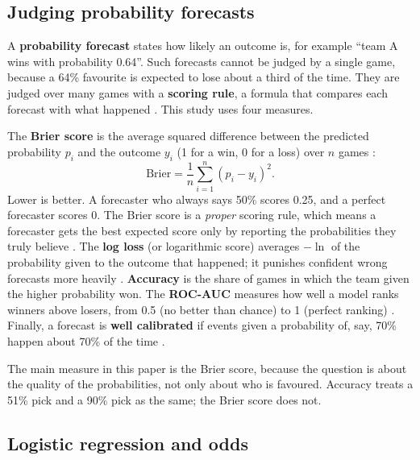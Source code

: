 \documentclass[12pt,a4paper]{article}
\begin{document}
\subsection{Judging probability forecasts}

A \textbf{probability forecast} states how likely an outcome is, for example ``team A wins with probability 0.64''. Such forecasts cannot be judged by a single game, because a 64\% favourite is expected to lose about a third of the time. They are judged over many games with a \textbf{scoring rule}, a formula that compares each forecast with what happened \citep{gneiting2007}. This study uses four measures.

The \textbf{Brier score} is the average squared difference between the predicted probability $p_i$ and the outcome $y_i$ (1 for a win, 0 for a loss) over $n$ games \citep{brier1950}:
\begin{equation}
\text{Brier} = \frac{1}{n}\sum_{i=1}^{n} (p_i - y_i)^2 .
\end{equation}
Lower is better. A forecaster who always says 50\% scores 0.25, and a perfect forecaster scores 0. The Brier score is a \emph{proper} scoring rule, which means a forecaster gets the best expected score only by reporting the probabilities they truly believe \citep{gneiting2007}. The \textbf{log loss} (or logarithmic score) averages $-\ln$ of the probability given to the outcome that happened; it punishes confident wrong forecasts more heavily \citep{gneiting2007}. \textbf{Accuracy} is the share of games in which the team given the higher probability won. The \textbf{ROC-AUC} measures how well a model ranks winners above losers, from 0.5 (no better than chance) to 1 (perfect ranking) \citep{fawcett2006}. Finally, a forecast is \textbf{well calibrated} if events given a probability of, say, 70\% happen about 70\% of the time \citep{gneiting2007}.

The main measure in this paper is the Brier score, because the question is about the quality of the probabilities, not only about who is favoured. Accuracy treats a 51\% pick and a 90\% pick as the same; the Brier score does not.

\subsection{Logistic regression and odds}
\end{document}
